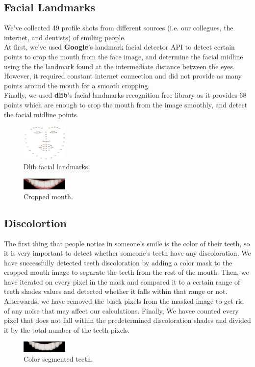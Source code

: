 \documentclass[conference,twocolumn]{IEEEtran}
\begin{document}
\subsection{Facial Landmarks}
 We've collected 49 profile shots from different sources (i.e. our collegues, the internet, and dentists) of smiling people.\\
 At first, we've used \textbf{Google}'s landmark facial detector API to detect certain points to crop the mouth from the face image, and determine the facial midline using the the landmark found at the intermediate distance between the eyes.
 However, it required constant internet connection and did not provide as many points around the mouth for a smooth cropping.\\
 Finally, we used \textbf{dlib}'s facial landmarks recognition free library as it provides 68 points which are enough to crop the mouth from the image smoothly, and detect the facial midline points.
 \begin{figure}[H]
    \centering
    \includegraphics[width=0.2\textwidth]{facial_landmarks.jpg}
    \caption{Dlib facial landmarks.}
    \label{fig:my_label}
\end{figure}
\begin{figure}[H]
   \centering
   \includegraphics[width=0.2\textwidth]{cropped_mouth.png}
   \caption{Cropped mouth.}
   \label{fig:my_label}
\end{figure}
\subsection{Discolortion}
 The first thing that people notice in someone's smile is the color of their teeth, so it is very important to detect whether someone's teeth have any discoloration.
 We have successfully detected teeth discoloration by adding a color mask to the cropped mouth image to separate the teeth from the rest of the mouth.
 Then, we have iterated on every pixel in the mask and compared it to a certain range of teeth shades values and detected whether it falls within that range or not.
 Afterwards, we have removed the black pixels from the masked image to get rid of any noise that may affect our calculations. Finally, We havee counted every pixel that does not fall within the predetermined discoloration shades and divided it by the total number of the teeth pixels.
 \begin{figure}[H]
    \centering
    \includegraphics[width=0.2\textwidth]{segmented_teeth.png}
    \caption{Color segmented teeth.}
    \label{fig:my_label}
\end{figure}
\end{document}
